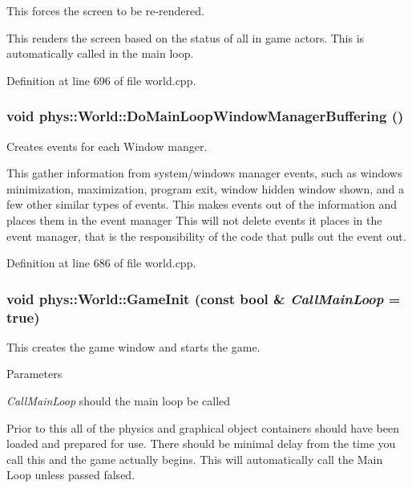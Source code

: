 This forces the screen to be re-\/rendered. 

This renders the screen based on the status of all in game actors. This is automatically called in the main loop. 

Definition at line 696 of file world.cpp.

\hypertarget{classphys_1_1World_af7bc68e5a19fd4c9c8cc2437485096e1}{
\subsubsection[{DoMainLoopWindowManagerBuffering}]{\setlength{\rightskip}{0pt plus 5cm}void phys::World::DoMainLoopWindowManagerBuffering ()}}
\label{da/ddf/classphys_1_1World_af7bc68e5a19fd4c9c8cc2437485096e1}


Creates events for each Window manger. 

This gather information from system/windows manager events, such as windows minimization, maximization, program exit, window hidden window shown, and a few other similar types of events. This makes events out of the information and places them in the event manager This will not delete events it places in the event manager, that is the responsibility of the code that pulls out the event out. 

Definition at line 686 of file world.cpp.

\hypertarget{classphys_1_1World_a21cc36be08a61f40619584d4c438936b}{
\subsubsection[{GameInit}]{\setlength{\rightskip}{0pt plus 5cm}void phys::World::GameInit (const bool \& {\em CallMainLoop} = {\ttfamily true})}}
\label{da/ddf/classphys_1_1World_a21cc36be08a61f40619584d4c438936b}


This creates the game window and starts the game. 


\begin{DoxyParams}{Parameters}
\item[{\em CallMainLoop}]should the main loop be called\end{DoxyParams}
Prior to this all of the physics and graphical object containers should have been loaded and prepared for use. There should be minimal delay from the time you call this and the game actually begins. This will automatically call the Main Loop unless passed falsed. 

